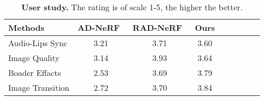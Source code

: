 \begin{table*}[t]
\begin{center}
\small
\renewcommand{\arraystretch}{1.1}
\begin{tabular}{l c c c c c c c c} 
\hline
Methods       & AD-NeRF~\cite{guo2021ad} & RAD-NeRF~\cite{tang2022radnerf} & Ours \\   
\hline
Audio-Lips Sync & 3.21 & 3.71 & 3.60 \\
Image Quality & 3.14 & 3.93 & 3.64\\
Boader Effacts & 2.53 & 3.69 & 3.79 \\
Image Transition & 2.72 & 3.70 & 3.84 \\
\hline 
\end{tabular}
\end{center}
\vspace{-0.3cm}
\caption{\textbf{User study.} 
The rating is of scale 1-5, the higher the better.
}
\label{tab:userstudy}
\end{table*}